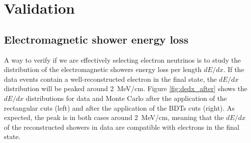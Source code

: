 
\section{Validation}
\subsection{Electromagnetic shower energy loss}
A way to verify if we are effectively selecting electron neutrinos is to study the distribution of the electromagnetic showers energy loss per length $dE/dx$. If the data events contain a well-reconstructed electron in the final state, the $dE/dx$ distribution will be peaked around 2~MeV/cm.
Figure \ref{fig:dedx_after} shows the $dE/dx$ distributions for data and Monte Carlo after the application of the rectangular cuts (left) and after the application of the BDTs cuts (right). As expected, the peak is in both cases around 2~MeV/cm, meaning that the $dE/dx$ of the reconstructed showers in data are compatible with electrons in the final state.

